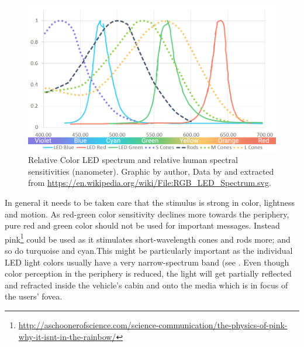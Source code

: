 \begin{figure}
    \includegraphics[width=1\textwidth]{fig/spectrum.jpg}
    \caption[LED and Human Spectrum]{Relative Color LED spectrum and relative human spectral sensitivities (nanometer). Graphic by author, Data by \citep{Stockman2000TheGenotype} and extracted from \url{https://en.wikipedia.org/wiki/File:RGB_LED_Spectrum.svg}.}
    \label{fig:spectrumLED}
\end{figure}

In general it needs to be taken care that the stimulus is strong in color, lightness and motion. As red-green color sensitivity declines more towards the periphery, pure red and green color should not be used for important messages. Instead pink\footnote{\url{http://aschoonerofscience.com/science-communication/the-physics-of-pink-why-it-isnt-in-the-rainbow/}} could be used as it stimulates short-wavelength cones and rods more; and so do turquoise and cyan.This might be particularly important as the individual LED light colors usually have a very narrow-spectrum band (see . Even though color perception in the periphery is reduced, the light will get partially reflected and refracted inside the vehicle's cabin and onto the media which is in focus of the users' fovea.  

